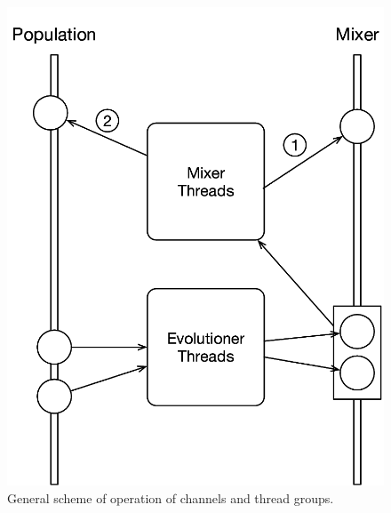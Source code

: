 \documentclass[runningheads]{llncs}\usepackage[]{graphicx}\usepackage[]{color}
\begin{document}
\begin{figure}[h!tb]
  \centering
\includegraphics[width=0.5\columnwidth]{../figure/popmixer}
\caption{General scheme of operation of channels and thread groups. }
\label{fig:scheme}
\end{figure}
%
\end{document}
